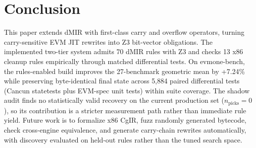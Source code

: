 \section{Conclusion}

This paper extends dMIR with first-class carry and overflow operators,
turning carry-sensitive EVM JIT rewrites into Z3 bit-vector obligations.
The implemented two-tier system admits 70 dMIR rules with Z3 and checks
13 x86 cleanup rules empirically through matched differential tests. On
evmone-bench, the rules-enabled build improves the 27-benchmark geometric
mean by +7.24\% while preserving byte-identical final state across
5{,}884 paired differential tests (Cancun statetests plus EVM-spec unit
tests) within suite coverage. The shadow audit
finds no statistically valid recovery on the current production set
($n_{\text{picks}}=0$), so its contribution is a stricter measurement path
rather than immediate rule yield. Future work is to formalize x86 CgIR, fuzz randomly generated bytecode,
check cross-engine equivalence, and generate carry-chain rewrites
automatically, with discovery evaluated on held-out rules rather than
the tuned search space.
